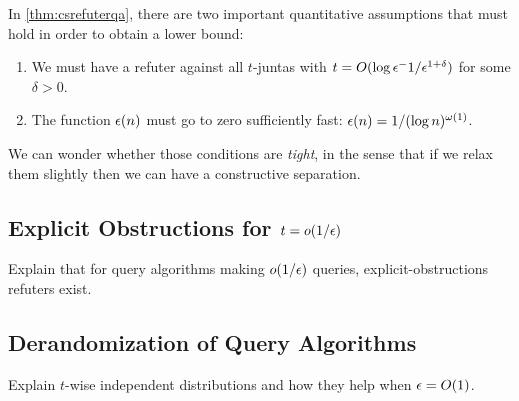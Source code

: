 In \cref{thm:csrefuterqa}, there are two important quantitative assumptions
that must hold in order to obtain a lower bound:

\begin{enumerate}
    \item We must have a refuter against all $t$-juntas with $t = O(\log \epsilon^-1 / \epsilon^{1+\delta})$ for
    some $\delta > 0$.
    \item The function $\epsilon(n)$ must go to zero sufficiently fast: $\epsilon(n) = 1/(\log n)^{\omega(1)}$.
\end{enumerate}

We can wonder whether those conditions are \emph{tight}, in the sense that if we relax them slightly 
then we can have a constructive separation. 

\subsection{Explicit Obstructions for $t = o(1/\epsilon)$}

Explain that for query algorithms making $o(1/\epsilon)$ queries, explicit-obstructions refuters exist.


\subsection{Derandomization of Query Algorithms}

Explain $t$-wise independent distributions and how they help when $\epsilon = O(1)$. 
